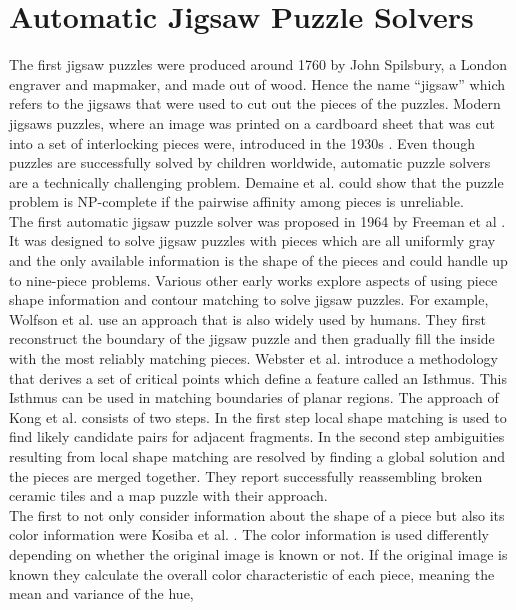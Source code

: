 \documentclass[11pt]{report}
\begin{document}
\section{Automatic Jigsaw Puzzle Solvers}
The first jigsaw puzzles were produced around 1760 by John Spilsbury, a
London engraver and mapmaker, and made out of wood.
Hence the name ``jigsaw'' which refers to the jigsaws that were used to cut out
the pieces of the puzzles. Modern jigsaws puzzles, where an image was printed on
a cardboard sheet that was cut into a set of interlocking pieces were, introduced
in the 1930s \cite{williams2004jigsaw}. Even though puzzles are successfully
solved by children worldwide, automatic puzzle solvers are a technically
challenging problem. Demaine et al. \cite{demaine2007jigsaw} could show that the
puzzle problem is NP-complete if the pairwise affinity among pieces is
unreliable. \\
The first automatic jigsaw puzzle solver was proposed in 1964 by Freeman et al
\cite{freeman1964apictorial}. It was designed to solve jigsaw puzzles with
pieces which are all uniformly gray and the only available information is the
shape of the pieces and could handle up to nine-piece problems. Various other
early works explore aspects of using piece shape information and contour
matching to solve jigsaw puzzles. For example, Wolfson et al. \cite{wolfson1988solving}
use an approach that is also widely used by humans. They first reconstruct the boundary of
the jigsaw puzzle and then gradually fill the inside with the most reliably matching
pieces. Webster et al. \cite{webster1990computer} introduce a methodology that
derives a set of critical points which define a feature called an Isthmus. This
Isthmus can be used in matching boundaries of planar regions. The approach of
Kong et al. \cite{kong2001solving} consists of two steps. In the first step
local shape matching is used to find likely candidate pairs for adjacent
fragments. In the second step ambiguities resulting from local shape matching
are resolved by finding a global solution and the pieces are merged together.
They report successfully reassembling broken ceramic tiles and a map puzzle with
their approach. \\
The first to not only consider information about the shape of a piece but also
its color information were Kosiba et al. \cite{kosiba1994automatic}. The color
information is used differently depending on whether the original image is known
or not. If the original image is known they calculate the overall color
characteristic of each piece, meaning the mean and variance of the hue,
\end{document}
